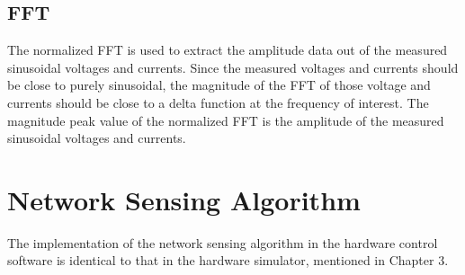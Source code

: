 \documentclass[11pt,twoside]{mitthesis}
\begin{document}
\subsection{FFT}
The normalized FFT is used to extract the amplitude data out of the measured sinusoidal voltages and currents.
Since the measured voltages and currents should be close to purely sinusoidal, the magnitude of the FFT of those voltage and currents should be close to a delta function at the frequency of interest.
The magnitude peak value of the normalized FFT is the amplitude of the measured sinusoidal voltages and currents.

\section{Network Sensing Algorithm}
 The implementation of the network sensing algorithm in the hardware control software is identical to that in the hardware simulator, mentioned in Chapter 3.

\ifdefined\DEBUG
\end{document}

